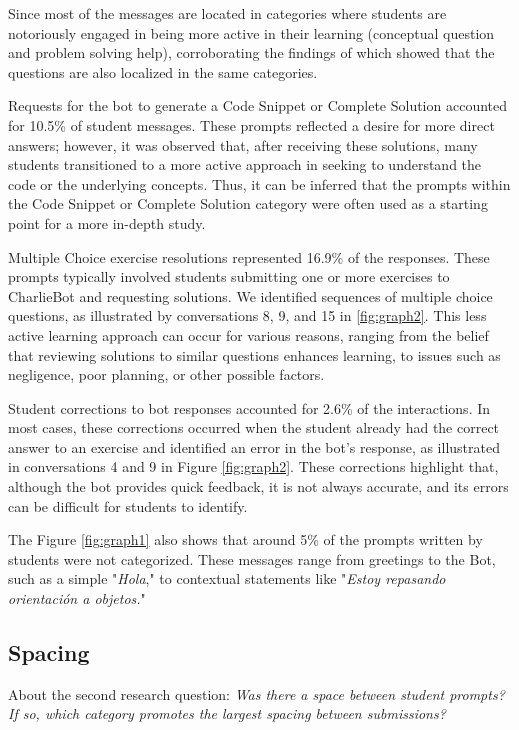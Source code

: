 \documentclass[a4paper,twoside]{article}
\begin{document}
Since most of the messages are located in categories where students are
notoriously engaged in being more active in their learning (conceptual question 
and problem solving help), corroborating the findings of \cite{Ghimire24} which 
showed that the questions are also localized in the same categories.

Requests for the bot to generate a Code Snippet or Complete Solution accounted
for 10.5\% of student messages. These prompts reflected a desire for more
direct answers; however, it was observed that, after receiving these solutions,
many students transitioned to a more active approach in seeking to understand
the code or the underlying concepts. Thus, it can be inferred that the prompts
within the Code Snippet or Complete Solution category were often used as a
starting point for a more in-depth study.

Multiple Choice exercise resolutions represented 16.9\% of the responses.
These prompts typically involved students submitting one or more exercises to
CharlieBot and requesting solutions. We identified sequences of multiple choice
questions, as illustrated by conversations 8, 9, and 15 in \ref{fig:graph2}.
This less active learning approach can occur for various reasons, ranging from
the belief that reviewing solutions to similar questions enhances learning, to
issues such as negligence, poor planning, or other possible factors.

Student corrections to bot responses accounted for 2.6\% of the
interactions. In most cases, these corrections occurred when the student already
had the correct answer to an exercise and identified an error in the bot’s
response, as illustrated in conversations 4 and 9 in Figure \ref{fig:graph2}.
These corrections highlight that, although the bot provides quick feedback, it
is not always accurate, and its errors can be difficult for students to
identify.

The Figure \ref{fig:graph1} also shows that around 5\% of the prompts written by
students were not categorized. These messages range from greetings to the Bot,
such as a simple "\textit{Hola}," to contextual statements like
"\textit{Estoy repasando orientación a objetos.}"

\subsection{Spacing}


About the second research question: \textit{Was there a space between student
prompts? If so, which category promotes the largest spacing between
submissions?}
\end{document}
